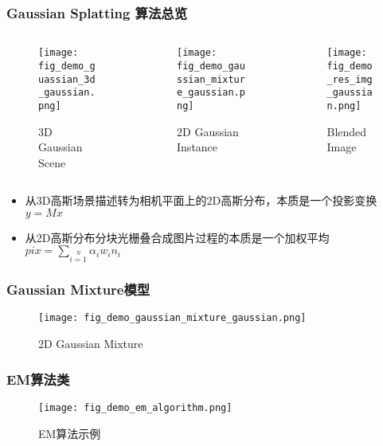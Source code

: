 \begin{frame}
    \frametitle{Gaussian Splatting 算法总览}
    \begin{columns}[c]
        \begin{column}{0.3\textwidth}
            \begin{figure}
                \texttt{[image: fig\_demo\_guassian\_3d\_gaussian.png]}
                \caption{3D Gaussian Scene}
            \end{figure}
        \end{column}
        \begin{column}{0.3\textwidth}
            \begin{figure}
                \texttt{[image: fig\_demo\_gaussian\_mixture\_gaussian.png]}
                \caption{2D Gaussian Instance}
            \end{figure}
        \end{column}
        \begin{column}{0.3\textwidth}
            \begin{figure}
                \texttt{[image: fig\_demo\_res\_img\_gaussian.png]}
                \caption{Blended Image}
            \end{figure}
        \end{column}
    \end{columns}
    \begin{itemize}
        \item 从3D高斯场景描述转为相机平面上的2D高斯分布，本质是一个投影变换$y=Mx$
        \item 从2D高斯分布分块光栅叠合成图片过程的本质是一个加权平均$pix=\sum\limits_{i=1}\limits^{N} \alpha_i w_in_i$
    \end{itemize}   
\end{frame}

\begin{frame}
    \frametitle{Gaussian Mixture模型}
    \begin{figure}[H]
        \texttt{[image: fig\_demo\_gaussian\_mixture\_gaussian.png]}
        \caption{2D Gaussian Mixture}
    \end{figure}
\end{frame}

\begin{frame}
    \frametitle{EM算法类}
    \begin{figure}[H]
        \texttt{[image: fig\_demo\_em\_algorithm.png]}
        \caption{EM算法示例}
    \end{figure}
\end{frame}

